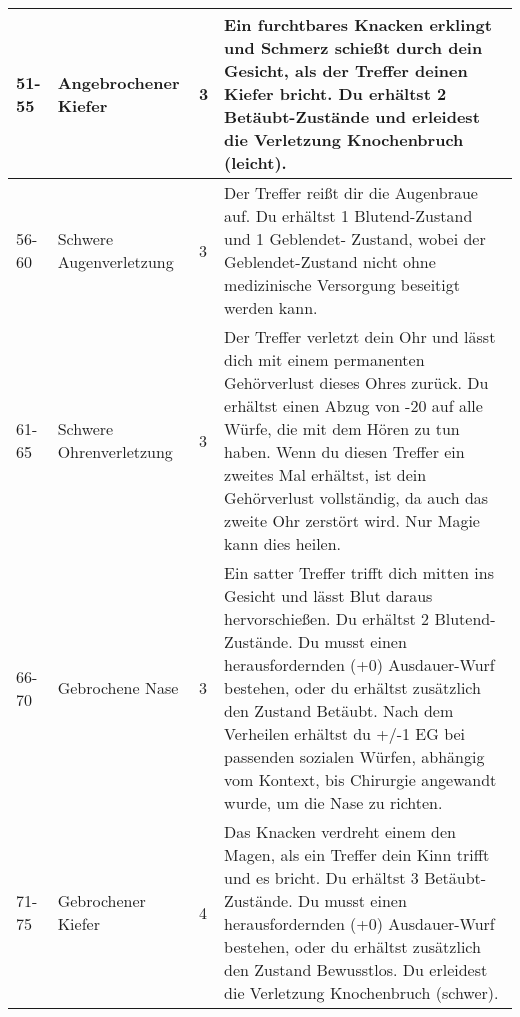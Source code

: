 \documentclass[a4paper, fontsize=8.5pt]{scrartcl}
\begin{document}
\begin{table}[!ht]
\begin{tabularx}{\textwidth}{lp{2.5cm}lX}
        51-55         & Angebrochener Kiefer    & 3           & Ein furchtbares Knacken erklingt und Schmerz schießt durch dein Gesicht, als der Treffer deinen Kiefer bricht. Du erhältst 2 Betäubt-Zustände und erleidest die Verletzung Knochenbruch (leicht).                                                                                                                                                                                                                                             \\ \hline
        56-60         & Schwere Augenverletzung & 3           & Der Treffer reißt dir die Augenbraue auf. Du erhältst 1 Blutend-Zustand und 1 Geblendet- Zustand, wobei der Geblendet-Zustand nicht ohne medizinische Versorgung beseitigt werden kann.                                                                                                                                                                                                                                                       \\ \hline
        61-65         & Schwere Ohrenverletzung & 3           & Der Treffer verletzt dein Ohr und lässt dich mit einem permanenten Gehörverlust dieses Ohres zurück. Du erhältst einen Abzug von -20 auf alle Würfe, die mit dem Hören zu tun haben. Wenn du diesen Treffer ein zweites Mal erhältst, ist dein Gehörverlust vollständig, da auch das zweite Ohr zerstört wird. Nur Magie kann dies heilen.                                                                                                    \\ \hline
        66-70         & Gebrochene Nase         & 3           & Ein satter Treffer trifft dich mitten ins Gesicht und lässt Blut daraus hervorschießen. Du erhältst 2 Blutend-Zustände. Du musst einen herausfordernden (+0) Ausdauer-Wurf bestehen, oder du erhältst zusätzlich den Zustand Betäubt. Nach dem Verheilen erhältst du +/-1 EG bei passenden sozialen Würfen, abhängig vom Kontext, bis Chirurgie angewandt wurde, um die Nase zu richten.                                                      \\ \hline
        71-75         & Gebrochener Kiefer      & 4           & Das Knacken verdreht einem den Magen, als ein Treffer dein Kinn trifft und es bricht. Du erhältst 3 Betäubt-Zustände. Du musst einen herausfordernden (+0) Ausdauer-Wurf bestehen, oder du erhältst zusätzlich den Zustand Bewusstlos. Du erleidest die Verletzung Knochenbruch (schwer).                                                                                                                                                     \\ \hline

\end{tabularx}
\end{table}
\end{document}

